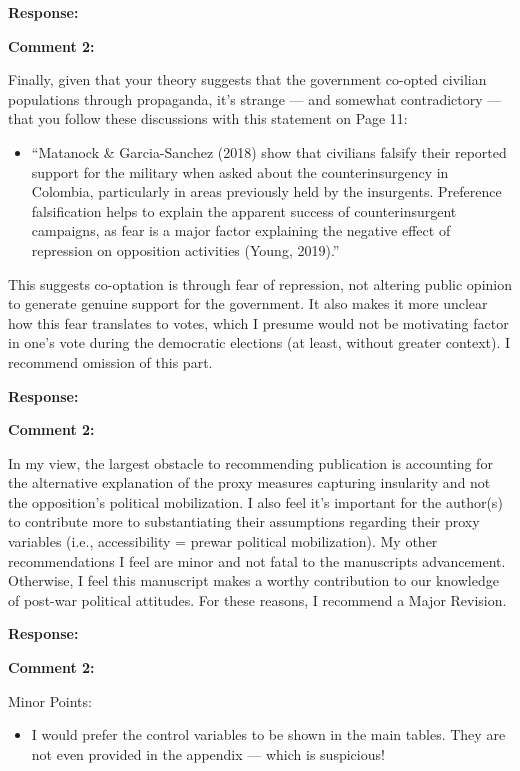 \documentclass[12pt, a4paper, notitlepage]{article}
\begin{document}
\noindent\textbf{Response:}

\vspace{15pt}
\noindent\textbf{Comment 2:}
\begin{displayquote}
Finally, given that your theory suggests that the government co-opted civilian populations through propaganda, it’s strange — and somewhat contradictory — that you follow these discussions with this statement on Page 11:
\begin{itemize}
  \item[] ``Matanock & Garcia-Sanchez (2018) show that civilians falsify their reported support for the military when asked about the counterinsurgency in Colombia, particularly in areas previously held by the insurgents. Preference falsification helps to explain the apparent success of counterinsurgent campaigns, as fear is a major factor explaining the negative effect of repression on opposition activities (Young, 2019).''
\end{itemize}
This suggests co-optation is through fear of repression, not altering public opinion to generate genuine support for the government. It also makes it more unclear how this fear translates to votes, which I presume would not be motivating factor in one’s vote during the democratic elections (at least, without greater context). I recommend omission of this part.
\end{displayquote}

\noindent\textbf{Response:}

\vspace{15pt}
\noindent\textbf{Comment 2:}
\begin{displayquote}
In my view, the largest obstacle to recommending publication is accounting for the alternative explanation of the proxy measures capturing insularity and not the opposition’s political mobilization. I also feel it’s important for the author(s) to contribute more to substantiating their assumptions regarding their proxy variables (i.e., accessibility = prewar political mobilization). My other recommendations I feel are minor and not fatal to the manuscripts advancement. Otherwise, I feel this manuscript makes a worthy contribution to our knowledge of post-war political attitudes. For these reasons, I recommend a Major Revision.
\end{displayquote}

\noindent\textbf{Response:}

\vspace{15pt}
\noindent\textbf{Comment 2:}
\begin{displayquote}
Minor Points:
\begin{itemize}
\item I would prefer the control variables to be shown in the main tables. They are not even provided in the appendix — which is suspicious!
\end{itemize}
\end{displayquote}
\end{document}
